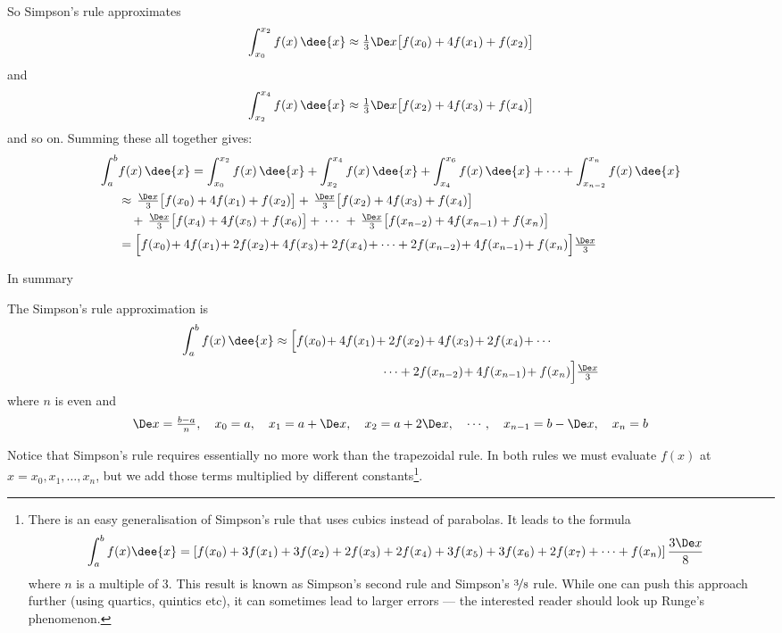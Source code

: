 So Simpson's rule approximates
\begin{equation*}
\int_{x_0}^{x_2} f(x)\,\dee{x}
\approx \tfrac{1}{3}\De x\big[f(x_0)+4f(x_1)+f(x_2)\big]
\end{equation*}
and
\begin{equation*}
\int_{x_2}^{x_4} f(x)\,\dee{x}
\approx \tfrac{1}{3}\De x\big[f(x_2)+4f(x_3)+f(x_4)\big]
\end{equation*}
and so on. Summing these all together gives:
\begin{align*}
\int_a^b& f(x)\,\dee{x}
=\int_{x_0}^{x_2} f(x)\,\dee{x}
+\int_{x_2}^{x_4} f(x)\,\dee{x}
+\int_{x_4}^{x_6} f(x)\,\dee{x}
+\cdots
+\int_{x_{n-2}}^{x_n} f(x)\,\dee{x}\\
&\approx\,\tfrac{\De x}{3}\big[f(x_0)+4f(x_1)+f(x_2)\big]
+\,\tfrac{\De x}{3}\big[f(x_2)+4f(x_3)+f(x_4)\big] \cr
&\ \ \ +\,\tfrac{\De x}{3}\big[f(x_4)+4f(x_5)+f(x_6)\big]
+\,\cdots\
+\,\tfrac{\De x}{3}\big[f(x_{n-2})+4f(x_{n-1})+f(x_n)\big]\\
&=\Big[f(x_0)\!+4f(x_1)\!+2f(x_2)\!+4f(x_3)\!+2f(x_4)\!
+\cdots+ 2f(x_{n-2})\!+4f(x_{n-1})\!+ f(x_n)\Big]\tfrac{\De x}{3}
\end{align*}

In summary
\begin{impeqn}\label{eq:SIMPrule}
The Simpson's rule approximation is
\begin{align*}
\int_a^b f(x)\,\dee{x}
&\approx\Big[f(x_0)\!+4f(x_1)\!+2f(x_2)\!+4f(x_3)\!+2f(x_4)\!
+\cdots \\
&\hspace{20ex}  \dots+ 2f(x_{n-2})\!+4f(x_{n-1})\!+ f(x_n)\Big]\tfrac{\De x}{3}
\end{align*}
where $n$ is even and
\begin{align*}
\De x = \tfrac{b-a}{n},\quad
x_0=a,\quad x_1=a+\De x,\quad
 x_2=a+2\De x,\quad
\cdots,\quad x_{n-1}=b-\De x,\quad
 x_n=b
\end{align*}
\end{impeqn}
Notice that Simpson's rule requires essentially no more work than the trapezoidal rule.
In both rules we must evaluate $f(x)$ at $x=x_0,x_1,\dots,x_n$, but we add those terms
multiplied by different constants\footnote{There is an easy generalisation of Simpson's
rule that uses cubics instead of parabolas. It leads to the formula
\begin{align*}
  \int_a^b f(x)\dee{x} &= \left[
f(x_0)+3f(x_1)+3f(x_2)+2f(x_3)+
2f(x_4)+3f(x_5)+3f(x_6)+2f(x_7)+\cdots+f(x_n)
 \right]\frac{3\De x}{8}
\end{align*}
where $n$ is a multiple of 3. This result is known as Simpson's second rule and Simpson's
$\nicefrac38$ rule. While one can push this approach further (using quartics, quintics
etc), it can sometimes lead to larger errors --- the interested reader should look up
Runge's phenomenon.
}.



